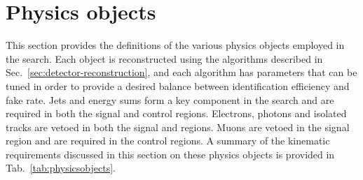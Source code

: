 \section{Physics objects}
\label{sec:analysis-physicsobjects}

This section provides the definitions of the various physics objects employed 
in the search. Each object is reconstructed using the algorithms described in 
Sec.~\ref{sec:detector-reconstruction}, and each algorithm has parameters that 
can be tuned 
in order to provide a desired balance between identification efficiency and 
fake rate. Jets and energy sums form a key component in the search and are 
required in both the signal and control regions. Electrons, photons and 
isolated tracks are vetoed in both the signal and regions. Muons are vetoed in 
the signal region and are required in the control regions. A summary of the 
kinematic requirements discussed in this section on these physics objects is 
provided in 
Tab.~\ref{tab:physicsobjects}.

